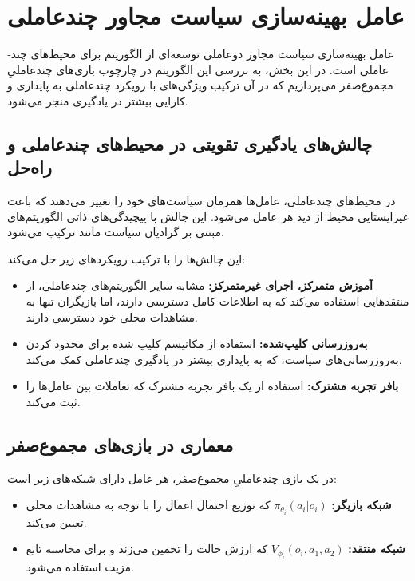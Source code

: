 \section{عامل بهینه‌سازی سیاست مجاور چند‌عاملی}\label{sec:MAPPO}

عامل بهینه‌سازی سیاست مجاور دو­عاملی
توسعه‌ای از الگوریتم  برای محیط‌های چند­عاملی است. در این بخش، به بررسی این الگوریتم در چارچوب بازی‌های چندعاملیِ مجموع­‌صفر می‌پردازیم که در آن ترکیب ویژگی‌های  با رویکرد چند­عاملی به پایداری و کارایی بیشتر در یادگیری منجر می‌شود.

\subsection{چالش‌های یادگیری تقویتی در محیط‌های چند­عاملی و راه‌حل }

در محیط‌های چند­عاملی، عامل‌ها همزمان سیاست‌های خود را تغییر می‌دهند که باعث غیرایستایی محیط از دید هر عامل می‌شود. این چالش با پیچیدگی‌های ذاتی الگوریتم‌های مبتنی بر گرادیان سیاست مانند  ترکیب می‌شود.

 این چالش‌ها را با ترکیب رویکردهای زیر حل می‌کند:
\begin{itemize}
    \item \textbf{آموزش متمرکز، اجرای غیرمتمرکز:} مشابه سایر الگوریتم‌های چندعاملی، از منتقدهایی استفاده می‌کند که به اطلاعات کامل دسترسی دارند، اما بازیگران تنها به مشاهدات محلی خود دسترسی دارند.
    \item \textbf{به‌روزرسانی کلیپ‌شده:} استفاده از مکانیسم کلیپ شده  برای محدود کردن به‌روزرسانی‌های سیاست، که به پایداری بیشتر در یادگیری چند‌عاملی کمک می‌کند.
    \item \textbf{بافر تجربه مشترک:} استفاده از یک بافر تجربه مشترک که تعاملات بین عامل‌ها را ثبت می‌کند.
\end{itemize}

\subsection{معماری  در بازی‌های مجموع­‌صفر}

در یک بازی چندعاملیِ مجموع­‌صفر، هر عامل دارای شبکه‌های زیر است:

\begin{itemize}
    \item \textbf{شبکه بازیگر:} $\pi_{\theta_i}(a_i|o_i)$ که توزیع احتمال اعمال را با توجه به مشاهدات محلی تعیین می‌کند.
    \item \textbf{شبکه منتقد:} $V_{\phi_i}(o_i, a_1, a_2)$ که ارزش حالت را تخمین می‌زند و برای محاسبه تابع مزیت استفاده می‌شود.
\end{itemize}

